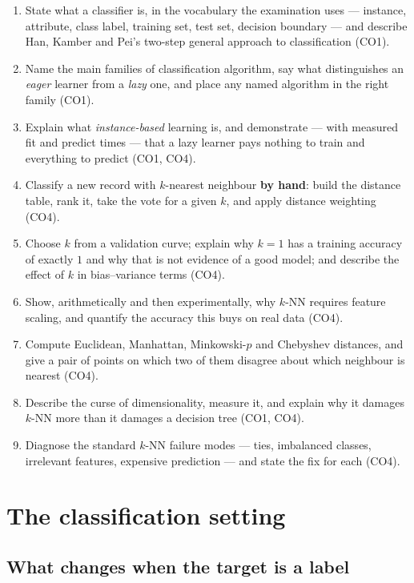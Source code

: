 \documentclass[11pt]{article}
\begin{document}
\begin{enumerate}[leftmargin=*]
  \item State what a classifier is, in the vocabulary the examination uses ---
    instance, attribute, class label, training set, test set, decision
    boundary --- and describe Han, Kamber and Pei's two-step general approach
    to classification (CO1).
  \item Name the main families of classification algorithm, say what
    distinguishes an \emph{eager} learner from a \emph{lazy} one, and place any
    named algorithm in the right family (CO1).
  \item Explain what \emph{instance-based} learning is, and demonstrate ---
    with measured fit and predict times --- that a lazy learner pays nothing to
    train and everything to predict (CO1, CO4).
  \item Classify a new record with $k$-nearest neighbour \textbf{by hand}: build
    the distance table, rank it, take the vote for a given $k$, and apply
    distance weighting (CO4).
  \item Choose $k$ from a validation curve; explain why $k=1$ has a training
    accuracy of exactly $1$ and why that is not evidence of a good model; and
    describe the effect of $k$ in bias--variance terms (CO4).
  \item Show, arithmetically and then experimentally, why $k$-NN requires
    feature scaling, and quantify the accuracy this buys on real data (CO4).
  \item Compute Euclidean, Manhattan, Minkowski-$p$ and Chebyshev distances,
    and give a pair of points on which two of them disagree about which
    neighbour is nearest (CO4).
  \item Describe the curse of dimensionality, measure it, and explain why it
    damages $k$-NN more than it damages a decision tree (CO1, CO4).
  \item Diagnose the standard $k$-NN failure modes --- ties, imbalanced
    classes, irrelevant features, expensive prediction --- and state the fix for
    each (CO4).
\end{enumerate}

\section{The classification setting}
\label{sec:setting}

\subsection{What changes when the target is a label}
\end{document}
